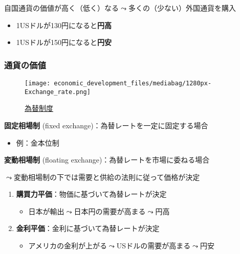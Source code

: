 \documentclass[
  xelatex,
  ja=standard]{bxjsarticle}
\providecommand{\tightlist}{%
  \setlength{\itemsep}{0pt}\setlength{\parskip}{0pt}}\usepackage{longtable,booktabs,array}
\begin{document}
自国通貨の価値が高く（低く）なる\(\leadsto\)多くの（少ない）外国通貨を購入

\begin{itemize}
\tightlist
\item
  1USドルが130円になると\textbf{円高}
\item
  1USドルが150円になると\textbf{円安}
\end{itemize}

\hypertarget{ux901aux8ca8ux306eux4fa1ux5024}{%
\subsubsection{通貨の価値}\label{ux901aux8ca8ux306eux4fa1ux5024}}

\begin{figure}[htpb]

{\centering \texttt{[image: economic\_development\_files/mediabag/1280px-Exchange\_rate.png]}

}

\caption{\href{https://commons.wikimedia.org/wiki/File:Exchange_rate_arrangements_map.svg}{為替制度}}

\end{figure}

\textbf{固定相場制} (fixed exchange)：為替レートを一定に固定する場合

\begin{itemize}
\tightlist
\item
  例：金本位制
\end{itemize}

\textbf{変動相場制} (floating exchange)：為替レートを市場に委ねる場合

\(\leadsto\)変動相場制の下では需要と供給の法則に従って価格が決定

\begin{enumerate}
\def\labelenumi{\arabic{enumi}.}
\tightlist
\item
  \textbf{購買力平価}：物価に基づいて為替レートが決定

  \begin{itemize}
  \tightlist
  \item
    日本が輸出\(\leadsto\)日本円の需要が高まる\(\leadsto\)円高
  \end{itemize}
\item
  \textbf{金利平価}：金利に基づいて為替レートが決定

  \begin{itemize}
  \tightlist
  \item
    アメリカの金利が上がる\(\leadsto\)USドルの需要が高まる\(\leadsto\)円安
  \end{itemize}
\end{enumerate}
\end{document}
